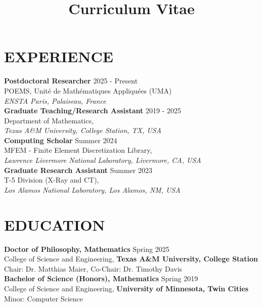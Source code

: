 \documentclass[10pt,a4paper,roman]{moderncv}
\title{Curriculum Vitae}
\begin{document}
\makecvtitle

\section{EXPERIENCE}

\textbf{Postdoctoral Researcher} \hfill 2025 - Present\\
POEMS, Unité de Mathématiques Appliquées (UMA)\\
\textit{ENSTA Paris, Palaiseau, France}\\

\textbf{Graduate Teaching/Research Assistant} \hfill 2019 - 2025\\
Department of Mathematics,\\
\textit{Texas A\&M University, College Station, TX, USA}\\

\textbf{Computing Scholar} \hfill Summer 2024\\
MFEM - Finite Element Discretization Library,\\
\textit{Lawrence Livermore National Laboratory, Livermore, CA, USA}\\

\textbf{Graduate Research Assistant} \hfill Summer 2023\\
T-5 Division (X-Ray and CT),\\
\textit{Los Alamos National Laboratory, Los Alamos, NM, USA}\\


\section{EDUCATION}

\textbf{Doctor of Philosophy, Mathematics} \hfill Spring  2025 \\
College of Science and Engineering, \textbf{Texas A\&M University, College Station}\\
Chair: Dr. Matthias Maier, Co-Chair: Dr. Timothy Davis \\

\textbf{Bachelor of Science (Honors), Mathematics} \hfill Spring 2019\\
College of Science and Engineering, \textbf{University of Minnesota, Twin Cities}\\
Minor: Computer Science \\
\end{document}
